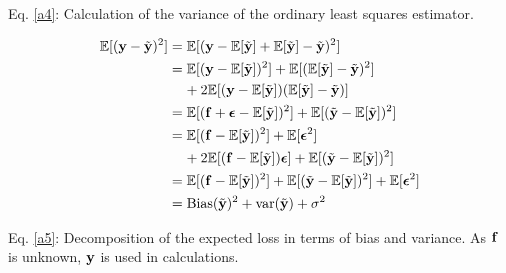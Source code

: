 Eq. \ref{a4}: Calculation of the variance of the ordinary least squares estimator. 

\begin{align}\label{a5}
    \fv{(\mathbf{y}-\yt)^2} & = \fv{(\mathbf{y} - \fv{\yt} + \fv{\yt} -\yt)^2} \nonumber \\
    & = \fv{(\mathbf{y} - \fv{\yt})^2} + \fv{(\fv{\yt} -\yt)^2} \nonumber \\
    & \;\;\;\; + 2\fv{(\mathbf{y} - \fv{\yt})(\fv{\yt} -\yt)} \nonumber \\
    & = \fv{(\mathbf{f} + \boldsymbol{\epsilon} - \fv{\yt})^2} + \fv{(\yt - \fv{\yt})^2} \nonumber \\
    & = \fv{(\mathbf{f}-\fv{\yt})^2}+\fv{\boldsymbol{\epsilon}^2} \nonumber \\
    & \;\;\;\; + 2\fv{(\mathbf{f}-\fv{\yt})\boldsymbol{\epsilon}} + \fv{(\yt - \fv{\yt})^2}  \nonumber \\
    & = \fv{(\mathbf{f}-\fv{\yt})^2} + \fv{(\yt - \fv{\yt})^2} +\fv{\boldsymbol{\epsilon}^2}\nonumber \\
    & = \text{Bias}(\yt)^2 + \text{var}(\yt) + \sigma^2
\end{align}

Eq. \ref{a5}: Decomposition of the expected loss in terms of bias and variance. As $\bold{f}$ is unknown, $\y$ is used in calculations. 






